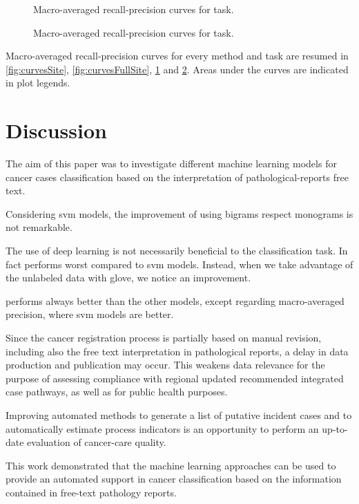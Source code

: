 \begin{figure}
  \centering
  \resizebox{0.9\textwidth}{!}{}
  \caption{Macro-averaged recall-precision curves for \type{} task.}
  \label{fig:curvesType}
\end{figure}

\begin{figure}
  \centering
  \resizebox{0.9\textwidth}{!}{}
  \caption{Macro-averaged recall-precision curves for \behaviour{} task.}
  \label{fig:curvesBehaviour}
\end{figure}

Macro-averaged recall-precision curves for every method and task are
resumed in \cref{fig:curvesSite}, \cref{fig:curvesFullSite},
\cref{fig:curvesType} and
\cref{fig:curvesBehaviour}. Areas under the curves are indicated in
plot legends.

\section{Discussion}
The aim of this paper was to investigate different machine learning
models for cancer cases classification based on the interpretation
of pathological-reports free text.

Considering \ac{svm} models, the improvement of using
bigrams respect monograms is not remarkable.

The use of deep learning is not necessarily beneficial to the
classification task. In fact \lstmng{}
performs worst compared to \ac{svm} models. Instead, when we take
advantage of the unlabeled data with \ac{glove}, we notice an
improvement.

\lstmb{} performs always better than the other models, except
regarding macro-averaged precision, where \ac{svm} models are better.

Since the cancer registration process is partially based on manual
revision, including also the free text interpretation in pathological
reports, a delay in data production and publication may occur. This
weakens data relevance for the purpose of assessing compliance with
regional updated recommended integrated case pathways, as well as for
public health purposes.

Improving automated methods to generate a list of putative incident
cases and to automatically estimate process indicators is an
opportunity to perform an up-to-date evaluation of cancer-care
quality.

This work demonstrated that the machine learning approaches can be
used to provide an automated support in cancer classification based on
the information contained in free-text pathology reports.

